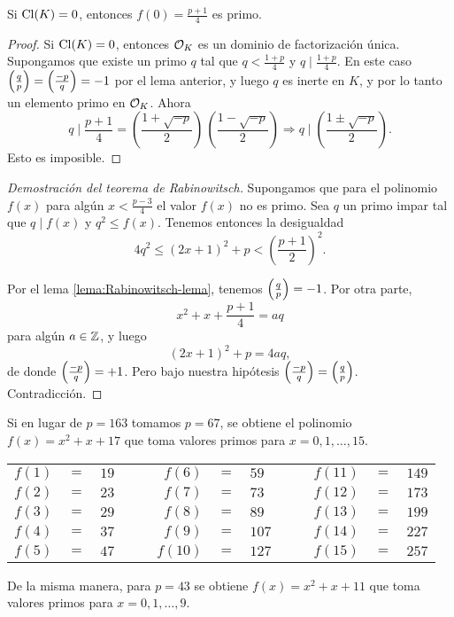 \begin{lema}
  Si $\operatorname{Cl} (K) = 0$, entonces $f (0) = \frac{p+1}{4}$ es primo.

  \begin{proof}
    Si $\operatorname{Cl} (K) = 0$, entonces $\mathcal{O}_K$ es un dominio de factorización única.
    Supongamos que existe un primo $q$ tal que
    $q < \frac{1+p}{4}$ y $q \mid \frac{1+p}{4}$. En este caso
    $\left(\frac{q}{p}\right) = \left(\frac{-p}{q}\right) = -1$ por el lema anterior, y luego $q$
    es inerte en $K$, y por lo tanto un elemento primo en $\mathcal{O}_K$. Ahora
    \[ q \mid \frac{p+1}{4} =
       \left(\frac{1 + \sqrt{-p}}{2}\right)\,\left(\frac{1 - \sqrt{-p}}{2}\right)
       \Longrightarrow
       q \mid \left(\frac{1 \pm \sqrt{-p}}{2}\right). \]
    Esto es imposible.
  \end{proof}
\end{lema}

\begin{proof}[Demostración del teorema de Rabinowitsch]
  Supongamos que para el polinomio $f (x)$ para algún $x < \frac{p-3}{4}$
  el valor $f (x)$ no es primo. Sea $q$ un primo impar tal que $q \mid f (x)$
  y $q^2 \le f (x)$. Tenemos entonces la desigualdad
  $$4q^2 \le (2x + 1)^2 + p < \left(\frac{p+1}{2}\right)^2.$$

  Por el lema \ref{lema:Rabinowitsch-lema}, tenemos $\left(\frac{q}{p}\right) = -1$.
  Por otra parte,
  $$x^2 + x + \frac{p+1}{4} = aq$$
  para algún $a \in \mathbb{Z}$, y luego
  $$(2x + 1)^2 + p = 4aq,$$
  de donde $\left(\frac{-p}{q}\right) = +1$. Pero bajo nuestra hipótesis
  $\left(\frac{-p}{q}\right) = \left(\frac{q}{p}\right)$. Contradicción.
\end{proof}

\begin{ejemplo}
  Si en lugar de $p = 163$ tomamos $p = 67$, se obtiene el polinomio
  $f (x) = x^2 + x + 17$ que toma valores primos para
  $x = 0,1,\ldots,15$.

  \begin{center}\renewcommand{\arraystretch}{1.5}
    \begin{tabular}{rclc|crclc|crcl}
      $f (1)$  & $=$ & $19$  & & & $f (6)$ & $=$ & $59$ & & & $f (11)$ & $=$ & $149$ \\
      $f (2)$  & $=$ & $23$  & & & $f (7)$ & $=$ & $73$ & & & $f (12)$ & $=$ & $173$ \\
      $f (3)$  & $=$ & $29$  & & & $f (8)$ & $=$ & $89$ & & & $f (13)$ & $=$ & $199$ \\
      $f (4)$  & $=$ & $37$  & & & $f (9)$ & $=$ & $107$ & & & $f (14)$ & $=$ & $227$ \\
      $f (5)$  & $=$ & $47$  & & & $f (10)$ & $=$ & $127$ & & & $f (15)$ & $=$ & $257$
    \end{tabular}
  \end{center}

  De la misma manera, para $p = 43$ se obtiene $f (x) = x^2 + x + 11$ que toma
  valores primos para $x = 0,1,\ldots,9$.
\end{ejemplo}

